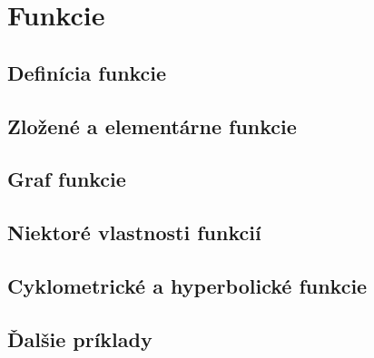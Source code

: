 \chapter{Funkcie}


\section{Definícia funkcie}


\section{Zložené a elementárne funkcie}


\section{Graf funkcie}


\section{Niektoré vlastnosti funkcií}


\section{Cyklometrické a hyperbolické funkcie}


\section{Ďalšie príklady}


